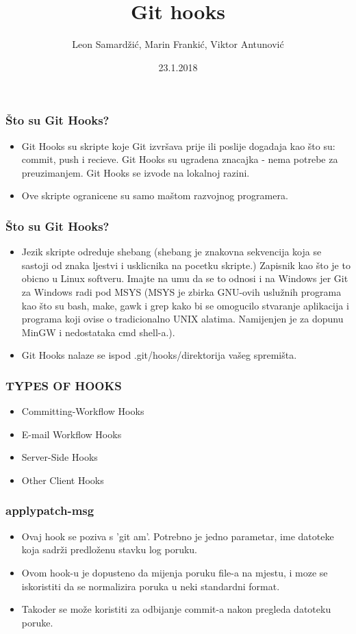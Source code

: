\documentclass{beamer}
\title{Git hooks}
\author{Leon Samardžić, Marin Frankić, Viktor Antunović}
\institute{Preddiplomski studij računarstva, Tehnički fakultet, Sveučilište u Rijeci}
\date{23.1.2018}
\begin{document}
\maketitle

\newpage

    
\begin{frame}
\frametitle{Što su Git Hooks?}
\begin{itemize}
    \item Git Hooks su skripte koje Git izvršava prije ili poslije dogadaja kao što su: commit, push i recieve. Git Hooks su ugradena znacajka - nema potrebe za preuzimanjem. Git Hooks se izvode na lokalnoj razini.
    \item Ove skripte ogranicene su samo maštom razvojnog programera.
\end{itemize}
\end{frame}
\begin{frame}
\frametitle{Što su Git Hooks?}
\begin{itemize}
    \item Jezik skripte odreduje shebang (shebang je znakovna sekvencija koja se sastoji od znaka ljestvi i usklicnika na pocetku skripte.) Zapisnik kao što je to obicno u Linux softveru. Imajte na umu da se to odnosi i na Windows jer Git za Windows radi pod MSYS (MSYS je zbirka GNU-ovih uslužnih programa kao što su bash, make, gawk i grep kako bi se omogucilo stvaranje aplikacija i programa koji ovise o tradicionalno UNIX alatima. Namijenjen je za dopunu MinGW i nedostataka cmd shell-a.).
    \item Git Hooks nalaze se ispod .git/hooks/direktorija vašeg spremišta.
\end{itemize}
\end{frame}

\begin{frame}
\frametitle{TYPES OF HOOKS}
\begin{itemize}
    \item Committing-Workflow Hooks
    \item E-mail Workflow Hooks
    \item Server-Side Hooks
    \item Other Client Hooks
\end{itemize}
\end{frame}


\begin{frame}
\frametitle{applypatch-msg}
\begin{itemize}
    \item Ovaj hook se poziva s 'git am'. Potrebno je jedno parametar, ime datoteke koja sadrži predloženu stavku log poruku.
    \item Ovom hook-u je dopusteno da mijenja poruku file-a na mjestu, i moze se iskoristiti da se normalizira poruka u neki standardni format.
    \item Takoder se može koristiti za odbijanje commit-a nakon pregleda datoteku poruke.
\end{itemize}
\end{frame}
\end{document}
